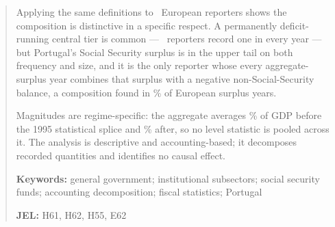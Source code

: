 \begin{abstract}
\noindent
Applying the same definitions to \BenchmarkCountries\ European reporters shows the
composition is distinctive in a specific respect. A permanently deficit-running central
tier is common --- \CentralAlwaysNegativeCountries\ reporters record one in every year
--- but Portugal's Social Security surplus is in the upper tail on both frequency and
size, and it is the only reporter whose every aggregate-surplus year combines that
surplus with a negative non-Social-Security balance, a composition found in
\SurplusOffsettingShare\% of European surplus years.

\noindent
Magnitudes are regime-specific: the aggregate averages \GgMeanHistorical\% of GDP
before the 1995 statistical splice and \GgMeanModern\% after, so no level statistic
is pooled across it. The analysis is descriptive and accounting-based; it decomposes
recorded quantities and identifies no causal effect.

\medskip
\noindent
\textbf{Keywords:} general government; institutional subsectors; social security
funds; accounting decomposition; fiscal statistics; Portugal

\noindent
\textbf{JEL:} H61, H62, H55, E62
\end{abstract}
